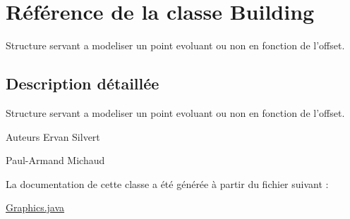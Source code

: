\hypertarget{classBuilding}{\section{Référence de la classe Building}
\label{classBuilding}
}


Structure servant a modeliser un point evoluant ou non en fonction de l'offset.  




\subsection{Description détaillée}
Structure servant a modeliser un point evoluant ou non en fonction de l'offset. 

\begin{DoxyAuthor}{Auteurs}
Ervan Silvert 

Paul-\/\-Armand Michaud 
\end{DoxyAuthor}


La documentation de cette classe a été générée à partir du fichier suivant \-:\begin{DoxyCompactItemize}
\item 
\hyperlink{Graphics_8java}{Graphics.\-java}\end{DoxyCompactItemize}
